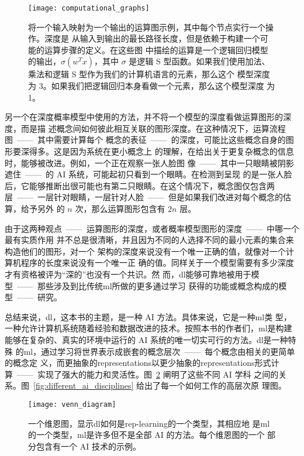 \begin{figure}[h]
  \centering
  \texttt{[image: computational\_graphs]}
  \caption{将一个输入映射为一个输出的运算图示例，其中每个节点实行一个操作。深度是
    从输入到输出的最长路径长度，但是依赖于构建一个可能的运算步骤的定义。在这些图
    中描绘的运算是一个逻辑回归模型的输出，$\sigma(w^Tx)$，其中 $\sigma$ 是逻辑 S
    型函数。如果我们使用加法、乘法和逻辑 S 型作为我们的计算机语言的元素，那么这个
    模型深度为 3。如果我们把逻辑回归本身看做一个元素，那么这个模型深度
    为 1。\label{fig:computational_graphs}}
\end{figure}

另一个在深度概率模型中使用的方法，并不将一个模型的深度看做运算图形的深度，而是描
述概念间如何彼此相互关联的图形深度。在这种情况下，运算流程图~——~其中需要计算每个
概念的表征~——~的深度，可能比这些概念自身的图形要深得多。这是因为系统在更小概念上
的理解，在给出关于更复杂概念的信息时，能够被改进。例如，一个正在观察一张人脸图
像~——~其中一只眼睛被阴影遮住~——~的 AI 系统，可能起初只看到一个眼睛。在检测到呈现
的是一张人脸后，它能够推断出很可能也有第二只眼睛。在这个情况下，概念图仅包含两
层~——~一层针对眼睛，一层针对人脸~——~但是如果我们改进对每个概念的估算，给予另外
的 $n$ 次，那么运算图形包含有 $2n$ 层。

由于这两种观点~——~运算图形的深度，或者概率模型图形的深度~——~中哪一个最有实质作用
并不总是很清晰，并且因为不同的人选择不同的最小元素的集合来构造他们的图形，对一个
架构的深度来说没有一个唯一正确的值，就像对一个计算机程序的长度来说没有一个唯一正
确的值。同样关于一个模型需要有多少深度才有资格被评为``深的''也没有一个共识。然
而，\gls*{dl}能够可靠地被用于模型~——~那些涉及到比传统\gls*{ml}所做的更多通过学习
获得的功能或概念构成的模型~——~研究。

总结来说，\gls*{dl}，这本书的主题，是一种 AI 方法。具体来说，它是一种\gls*{ml}类
型，一种允许计算机系统随着经验和数据改进的技术。按照本书的作者们，\gls*{ml}是构建
能够在复杂的、真实的环境中运行的 AI 系统的唯一切实可行的方法。\gls*{dl}是一种特殊
的\gls*{ml}，通过学习将世界表示成嵌套的概念层次~——~每个概念由相关的更简单的概念定
义，而更抽象的\gls*{representations}以更少抽象的\gls*{representations}形式计
算~——~实现了强大的能力和灵活性。图~\ref{fig:venn_diagram} 阐明了这些不同 AI 学科
之间的关系。图~\ref{fig:different_ai_disciplines} 给出了每一个如何工作的高层次原
理图。

\begin{figure}[h]
  \centering
  \texttt{[image: venn\_diagram]}
  \caption{一个维恩图，显示\gls*{dl}如何是\gls*{rep-learning}的一个类型，其相应地
    是\gls*{ml}的一个类型，\gls*{ml}是许多但不是全部 AI 的方法。每个维恩图的一个
    部分包含有一个 AI 技术的示例。\label{fig:venn_diagram}}
\end{figure}

